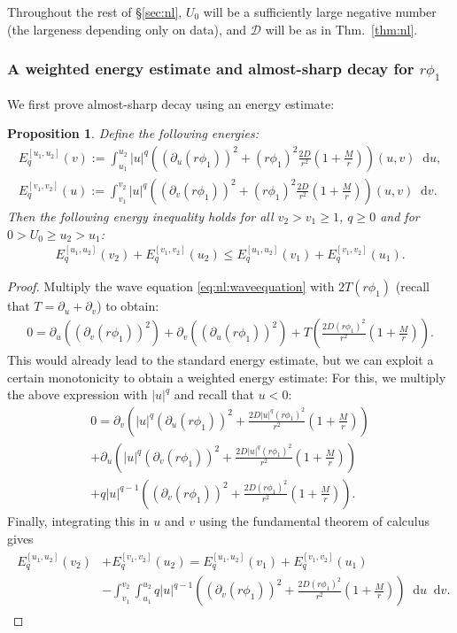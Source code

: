 \documentclass[11pt,english]{article}
\numberwithin{equation}{section}
\theoremstyle{remark}
\theoremstyle{plain}
\newtheorem{prop}{Proposition}[section]
\theoremstyle{remark}
\newcommand{\dd}{\mathop{}\!\mathrm{d}}
\newcommand{\pu}{\partial_u}
\newcommand{\pv}{\partial_v}
\renewcommand{\(}{\left(}
\renewcommand{\)}{\right)}
\newcommand{\pho}{(r\phi_1)}
\begin{document}
Throughout the rest of \S\ref{sec:nl}, $U_0$ will be a sufficiently large negative number (the largeness depending only on data), and $\mathcal D$ will be as in Thm.~\ref{thm:nl}.

\subsubsection{A weighted energy estimate and almost-sharp decay for \texorpdfstring{$r\phi_1$}{r phi1}}
We first prove almost-sharp decay using an energy estimate:
\begin{prop}\label{prop:l:energy}
Define the following energies:
\begin{align*}
E_{q}^{[u_1,u_2]}(v):=\int_{u_1}^{u_2} |u|^q \left( 	(\pu\pho)^2 +(r\phi_1)^2 \frac{2D}{r^2}\left(1+\frac{M}{r}\right)\right) (u,v)\dd u,\\
E_{q}^{[v_1,v_2]}(u):=\int_{v_1}^{v_2}|u|^q \left( 	(\pv\pho)^2 +(r\phi_1)^2 \frac{2D}{r^2}\left(1+\frac{M}{r}\right)\right)(u,v)\dd v.
\end{align*}
Then the following energy inequality holds for all $v_2>v_1\geq 1$, $q\geq0$ and for  $0>U_0\geq u_2>u_1$:
\begin{align}
	E_{q}^{[u_1,u_2]}(v_2)+E_{q}^{[v_1,v_2]}(u_2)\leq E_{q}^{[u_1,u_2]}(v_1)+E_{q}^{[v_1,v_2]}(u_1).
\end{align}
\end{prop}
\begin{proof}
Multiply the wave equation \eqref{eq:nl:waveequation} with $2 T(r\phi_1)$ (recall that $T=\pu+\pv$) to obtain:
\begin{align*}
0=\pu\left((\pv\pho)^2\right)+\pv\left((\pu\pho)^2\right)+T\left(\frac{2D(r\phi_1)^2}{r^2}\left(1+\frac{M}{r}\right)\right).
\end{align*}
This would already lead to the standard energy estimate, but we can exploit a certain monotonicity to obtain a weighted energy estimate: 
For this, we multiply the above expression  with $|u|^q$ and recall that $u<0$:
\begin{align*}
0=\pv\left(|u|^q	(\pu\pho)^2 +\frac{2D|u|^q(r\phi_1)^2 }{r^2}\left(1+\frac{M}{r}\right)\right)\\
+\pu\left(|u|^q	(\pv\pho)^2 +\frac{2D|u|^q(r\phi_1)^2 }{r^2}\left(1+\frac{M}{r}\right)\right)\\
+q|u|^{q-1}\left((\pv\pho)^2+\frac{2D\pho^2}{r^2}\left(1+\frac{M}{r}\right)\right).
\end{align*}
Finally, integrating this in $u$ and $v$ using the fundamental theorem of calculus gives
\begin{align}\begin{split}
	E_{q}^{[u_1,u_2]}(v_2)&+E_{q}^{[v_1,v_2]}(u_2)= E_{q}^{[u_1,u_2]}(v_1)+E_{q}^{[v_1,v_2]}(u_1)\\
	&-\int_{v_1}^{v_2}\int_{u_1}^{u_2}q|u|^{q-1}\left((\pv\pho)^2+\frac{2D\pho^2}{r^2}\left(1+\frac{M}{r}\right)\right)\dd u\dd v.
\end{split}\end{align}
\end{proof}
\end{document}
